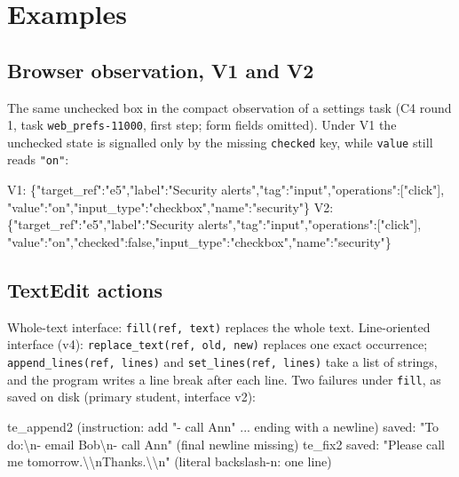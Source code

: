 \documentclass[
  10pt,
]{article}
\newenvironment{Shaded}{}{}
\newcommand{\NormalTok}[1]{#1}
\begin{document}
\section{Examples}\label{examples}

\subsection{Browser observation, V1 and
V2}\label{browser-observation-v1-and-v2}

The same unchecked box in the compact observation of a settings task (C4
round 1, task \texttt{web\_prefs-11000}, first step; form fields
omitted). Under V1 the unchecked state is signalled only by the missing
\texttt{checked} key, while \texttt{value} still reads \texttt{"on"}:

\begin{Shaded}
\begin{Highlighting}[]
\NormalTok{V1: \{"target\_ref":"e5","label":"Security alerts","tag":"input","operations":["click"],}
\NormalTok{     "value":"on","input\_type":"checkbox","name":"security"\}}
\NormalTok{V2: \{"target\_ref":"e5","label":"Security alerts","tag":"input","operations":["click"],}
\NormalTok{     "value":"on","checked":false,"input\_type":"checkbox","name":"security"\}}
\end{Highlighting}
\end{Shaded}

\subsection{TextEdit actions}\label{textedit-actions}

Whole-text interface: \texttt{fill(ref,\ text)} replaces the whole text.
Line-oriented interface (v4): \texttt{replace\_text(ref,\ old,\ new)}
replaces one exact occurrence; \texttt{append\_lines(ref,\ lines)} and
\texttt{set\_lines(ref,\ lines)} take a list of strings, and the program
writes a line break after each line. Two failures under \texttt{fill},
as saved on disk (primary student, interface v2):

\begin{Shaded}
\begin{Highlighting}[]
\NormalTok{te\_append2 (instruction: add "{-} call Ann" ... ending with a newline)}
\NormalTok{  saved: "To do:\textbackslash{}n{-} email Bob\textbackslash{}n{-} call Ann"          (final newline missing)}
\NormalTok{te\_fix2}
\NormalTok{  saved: "Please call me tomorrow.\textbackslash{}\textbackslash{}nThanks.\textbackslash{}\textbackslash{}n"     (literal backslash{-}n: one line)}
\end{Highlighting}
\end{Shaded}
\end{document}
